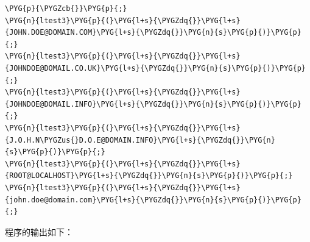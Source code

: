 \begin{codeblockbg}
\begin{Verbatim}[commandchars=\\\{\},breaklines=true,breakanywhere=true,fontsize=\codefont,xleftmargin=17bp]
\PYG{p}{\PYGZcb{}}\PYG{p}{;}
\PYG{n}{ltest3}\PYG{p}{(}\PYG{l+s}{\PYGZdq{}}\PYG{l+s}{JOHN.DOE@DOMAIN.COM}\PYG{l+s}{\PYGZdq{}}\PYG{n}{s}\PYG{p}{)}\PYG{p}{;}
\PYG{n}{ltest3}\PYG{p}{(}\PYG{l+s}{\PYGZdq{}}\PYG{l+s}{JOHNDOE@DOMAIL.CO.UK}\PYG{l+s}{\PYGZdq{}}\PYG{n}{s}\PYG{p}{)}\PYG{p}{;}
\PYG{n}{ltest3}\PYG{p}{(}\PYG{l+s}{\PYGZdq{}}\PYG{l+s}{JOHNDOE@DOMAIL.INFO}\PYG{l+s}{\PYGZdq{}}\PYG{n}{s}\PYG{p}{)}\PYG{p}{;}
\PYG{n}{ltest3}\PYG{p}{(}\PYG{l+s}{\PYGZdq{}}\PYG{l+s}{J.O.H.N\PYGZus{}D.O.E@DOMAIN.INFO}\PYG{l+s}{\PYGZdq{}}\PYG{n}{s}\PYG{p}{)}\PYG{p}{;}
\PYG{n}{ltest3}\PYG{p}{(}\PYG{l+s}{\PYGZdq{}}\PYG{l+s}{ROOT@LOCALHOST}\PYG{l+s}{\PYGZdq{}}\PYG{n}{s}\PYG{p}{)}\PYG{p}{;}
\PYG{n}{ltest3}\PYG{p}{(}\PYG{l+s}{\PYGZdq{}}\PYG{l+s}{john.doe@domain.com}\PYG{l+s}{\PYGZdq{}}\PYG{n}{s}\PYG{p}{)}\PYG{p}{;}
\end{Verbatim}
\end{codeblockbg}



程序的输出如下：



